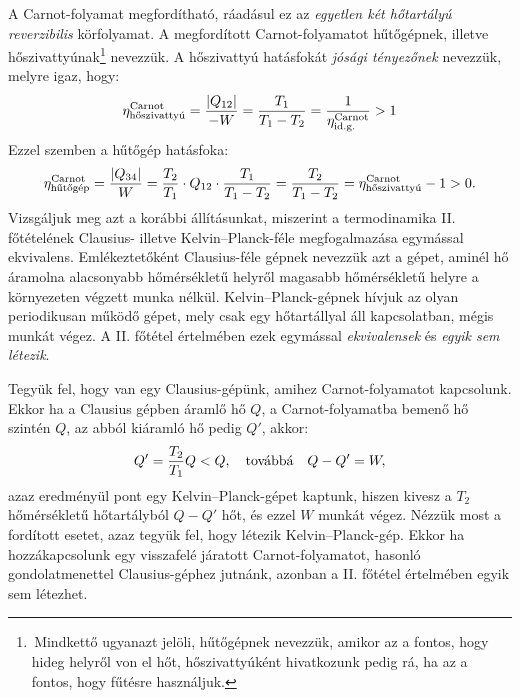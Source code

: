 A Carnot-folyamat megfordítható, ráadásul ez az \emph{egyetlen két hőtartályú reverzibilis} körfolyamat. A megfordított Carnot-folyamatot hűtőgépnek, illetve hőszivattyúnak\footnote{\,Mindkettő ugyanazt jelöli, hűtőgépnek nevezzük, amikor az a fontos, hogy hideg helyről von el hőt, hőszivattyúként hivatkozunk pedig rá, ha az a fontos, hogy fűtésre használjuk.} nevezzük. 
A hőszivattyú hatásfokát \emph{jósági tényezőnek} nevezzük, melyre igaz, hogy:
\begin{align}
	\eta_{\textnormal{hőszivattyú}}^{\textnormal{Carnot}} = \frac{|Q_{12}|}{-W} = \frac{T_1}{T_1-T_2} = \frac{1}{\eta_{\textnormal{id.g.}}^{\textnormal{Carnot}}}>1
\end{align}
Ezzel szemben a hűtőgép hatásfoka:
\begin{align}
	\eta_{\textnormal{hűtőgép}}^{\textnormal{Carnot}} = \frac{|Q_{34}|}{W} = \frac{T_2}{T_1}\cdot Q_{12}\cdot \frac{T_1}{T_1-T_2} = \frac{T_2}{T_1-T_2} = \eta_{\textnormal{hőszivattyú}}^{\textnormal{Carnot}}-1>0.
\end{align}
Vizsgáljuk meg azt a korábbi állításunkat, miszerint a termodinamika II. főtételének Clausius- illetve Kelvin--Planck-féle megfogalmazása egymással ekvivalens. Emlékeztetőként Clausius-féle gépnek nevezzük azt a gépet, aminél hő áramolna alacsonyabb hőmérsékletű helyről magasabb hőmérsékletű helyre a környezeten végzett munka nélkül. Kelvin--Planck-gépnek hívjuk az olyan periodikusan működő gépet, mely csak egy hőtartállyal áll kapcsolatban, mégis munkát végez. A II. főtétel értelmében ezek egymással \emph{ekvivalensek} és \emph{egyik sem létezik}.

Tegyük fel, hogy van egy Clausius-gépünk, amihez Carnot-folyamatot kapcsolunk. Ekkor ha a Clausius gépben áramlő hő $Q$, a Carnot-folyamatba bemenő hő szintén $Q$, az abból kiáramló hő pedig $Q'$, akkor:
\begin{align}
	Q' = \frac{T_2}{T_1}Q<Q,\quad\textnormal{továbbá}\quad Q-Q'=W,
\end{align}	
azaz eredményül pont egy Kelvin--Planck-gépet kaptunk, hiszen kivesz a $T_2$ hőmérsékletű hőtartályból $Q-Q'$ hőt, és ezzel $W$ munkát végez. Nézzük most a fordított esetet, azaz tegyük fel, hogy létezik Kelvin--Planck-gép. Ekkor ha hozzákapcsolunk egy visszafelé járatott Carnot-folyamatot, hasonló gondolatmenettel Clausius-géphez jutnánk, azonban a II. főtétel értelmében egyik sem létezhet. 

